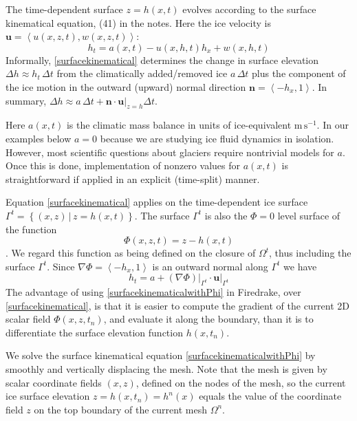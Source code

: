 \documentclass[letterpaper,final,12pt,reqno]{amsart}
\newcommand{\grad}{\nabla}
\newcommand{\bn}{\mathbf{n}}
\newcommand{\bu}{\mathbf{u}}
\begin{document}
The time-dependent surface $z=h(x,t)$ evolves according to the surface kinematical equation, (41) in the notes.  Here the ice velocity is $\bu=\left<u(x,z,t),w(x,z,t)\right>$:
\begin{equation}
h_t = a(x,t) - u(x,h,t) h_x + w(x,h,t) \label{surfacekinematical}
\end{equation}
Informally, \eqref{surfacekinematical} determines the change in surface elevation $\Delta h \approx h_t\,\Delta t$ from the climatically added/removed ice $a\,\Delta t$ plus the component of the ice motion in the outward (upward) normal direction $\bn = \left<-h_x,1\right>$.  In summary, $\Delta h \approx a \,\Delta t + \bn\cdot \bu\big|_{z=h} \Delta t$.

Here $a(x,t)$ is the climatic mass balance in units of ice-equivalent $\text{m}\,\text{s}^{-1}$.  In our examples below $a=0$ because we are studying ice fluid dynamics in isolation.  However, most scientific questions about glaciers require nontrivial models for $a$.  Once this is done, implementation of nonzero values for $a(x,t)$ is straightforward if applied in an explicit (time-split) manner.

Equation \eqref{surfacekinematical} applies on the time-dependent ice surface $\Gamma^t = \left\{(x,z) \,\big|\, z = h(x,t)\right\}$.  The surface $\Gamma^t$ is also the $\Phi=0$ level surface of the function
    $$\Phi(x,z,t) = z - h(x,t)$$
\cite[pp.~65--66]{GreveBlatter2009}.  We regard this function as being defined on the closure of $\Omega^t$, thus including the surface $\Gamma^t$.  Since $\grad \Phi = \left<-h_x,1\right>$ is an outward normal along $\Gamma^t$ we have
\begin{equation}
h_t = a + (\grad \Phi)\big|_{\Gamma^t} \cdot \bu\big|_{\Gamma^t}  \label{surfacekinematicalwithPhi}
\end{equation}
The advantage of using \eqref{surfacekinematicalwithPhi} in Firedrake, over \eqref{surfacekinematical}, is that it is easier to compute the gradient of the current 2D scalar field $\Phi(x,z,t_n)$, and evaluate it along the boundary, than it is to differentiate the surface elevation function $h(x,t_n)$.

We solve the surface kinematical equation \eqref{surfacekinematicalwithPhi} by smoothly and vertically displacing the mesh.  Note that the mesh is given by scalar coordinate fields $(x,z)$, defined on the nodes of the mesh, so the current ice surface elevation $z=h(x,t_n)=h^n(x)$ equals the value of the coordinate field $z$ on the top boundary of the current mesh $\Omega^n$.
\end{document}
